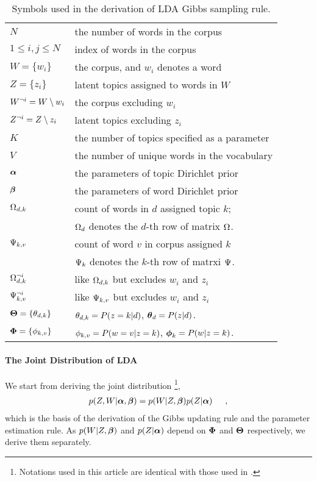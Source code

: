 \begin{table}
  \centering
  \begin{tabular}{ll}
    \hline
    $N$ & the number of words in the corpus \\
    $1\leq i,j \leq N$ & index of words in the corpus \\
    $W=\{w_i\}$ & the corpus, and $w_i$ denotes a word \\
    $Z=\{z_i\}$ & latent topics assigned to words in $W$ \\
    $W^{\neg i}=W \setminus w_i$ & the corpus excluding $w_i$ \\
    $Z^{\neg i}=Z \setminus z_i$ & latent topics excluding $z_i$ \\
    $K$ & the number of topics specified as a parameter \\
    $V$ & the number of unique words in the vocabulary \\
    $\boldsymbol{\alpha}$ & the parameters of topic Dirichlet prior \\
    $\boldsymbol{\beta}$ & the parameters of word Dirichlet prior \\
    $\Omega_{d,k}$ & count of words in $d$ assigned topic $k$; \\
    & $\Omega_{d}$ denotes the $d$-th row of matrix $\Omega_{}$. \\
    $\Psi_{k,v}$ & count of word $v$ in corpus assigned $k$ \\
    & $\Psi_{k}$ denotes the $k$-th row of matrxi $\Psi_{}$. \\
    $\Omega_{d,k}^{\neg i}$ & like $\Omega_{d,k}$ but excludes $w_i$ and $z_i$ \\
    $\Psi_{k,v}^{\neg i}$ & like $\Psi_{k,v}$ but excludes $w_i$ and $z_i$ \\
    $\boldsymbol{\Theta}=\{\theta_{d,k}\}$ & $\theta_{d,k}=P(z=k|d)$, $\boldsymbol{\theta}_{d}=P(z|d)$. \\
    $\boldsymbol{\Phi}=\{\phi_{k,v}\}$ & $\phi_{k,v}=P(w=v|z=k)$, $\boldsymbol{\phi}_{k}=P(w|z=k)$. \\
    \hline
  \end{tabular}
  \caption{Symbols used in the derivation of LDA Gibbs sampling rule.}
  \label{tab:symbols}
\end{table}
\paragraph{The Joint Distribution of LDA}

We start from deriving the joint distribution \footnote{Notations used
  in this article are identical with those used in \cite{heinrich}.},
\begin{equation}
  \label{eq:joint-dist}
  \begin{split}
  p(Z,W|\boldsymbol{\alpha},\boldsymbol{\beta})
  &=
  p(W|Z,\boldsymbol{\beta})
  p(Z|\boldsymbol{\alpha})
  \end{split}
  \enspace,
\end{equation}
which is the basis of the derivation of the Gibbs updating rule and
the parameter estimation rule.  As $p(W|Z,\boldsymbol{\beta})$ and
$p(Z|\boldsymbol{\alpha})$ depend on $\boldsymbol{\Phi}$ and $\boldsymbol{\Theta}$
respectively, we derive them separately.


